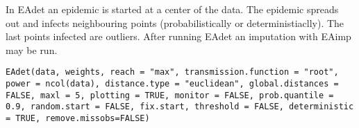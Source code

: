 %
\begin{Description}\relax
In EAdet an epidemic is started at a center of the data. 
The epidemic spreads out and infects neighbouring points (probabilistically or deterministiaclly). 
The last points infected are outliers. After running EAdet an imputation with EAimp may be run. 

\end{Description}
%
\begin{Usage}
\begin{verbatim}
EAdet(data, weights, reach = "max", transmission.function = "root", power = ncol(data), distance.type = "euclidean", global.distances = FALSE, maxl = 5, plotting = TRUE, monitor = FALSE, prob.quantile = 0.9, random.start = FALSE, fix.start, threshold = FALSE, deterministic = TRUE, remove.missobs=FALSE)
\end{verbatim}
\end{Usage}
%
